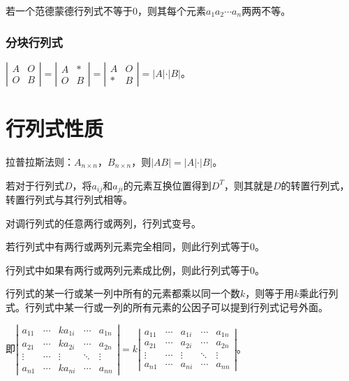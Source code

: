 \documentclass[UTF8, 12pt]{ctexart}
\begin{document}
若一个范德蒙德行列式不等于0，则其每个元素$a_1a_2\cdots a_n$两两不等。

\subsubsection{分块行列式}

$\left|\begin{array}{cc}
    A & O \\
    O & B
\end{array}\right|=
\left|\begin{array}{cc}
    A & * \\
    O & B
\end{array}\right|=
\left|\begin{array}{cc}
    A & O \\
    * & B
\end{array}\right|=\vert A\vert\cdot\vert B\vert$。

\section{行列式性质}

拉普拉斯法则：$A_{n\times n}$，$B_{n\times n}$，则$\vert AB\vert=\vert A\vert\cdot\vert B\vert$。

若对于行列式$D$，将$a_{ij}$和$a_{ji}$的元素互换位置得到$D^T$，则其就是$D$的转置行列式，转置行列式与其行列式相等。

对调行列式的任意两行或两列，行列式变号。

若行列式中有两行或两列元素完全相同，则此行列式等于0。

行列式中如果有两行或两列元素成比例，则此行列式等于0。

行列式的某一行或某一列中所有的元素都乘以同一个数$k$，则等于用$k$乘此行列式。行列式中某一行或一列的所有元素的公因子可以提到行列式记号外面。

即$
\left|\begin{array}{ccccc} 
    a_{11} & \cdots & ka_{1i} & \cdots & a_{1n} \\
    a_{21} & \cdots & ka_{2i} & \cdots & a_{2n} \\
    \vdots & \cdots & \vdots & \ddots & \vdots \\
    a_{n1} & \cdots & ka_{ni} & \cdots & a_{nn}
\end{array}\right| 
=k\left|\begin{array}{ccccc} 
    a_{11} & \cdots & a_{1i} & \cdots & a_{1n} \\
    a_{21} & \cdots & a_{2i} & \cdots & a_{2n} \\
    \vdots & \cdots & \vdots & \ddots & \vdots \\
    a_{n1} & \cdots & a_{ni} & \cdots & a_{nn}
\end{array}\right|$。
\end{document}
